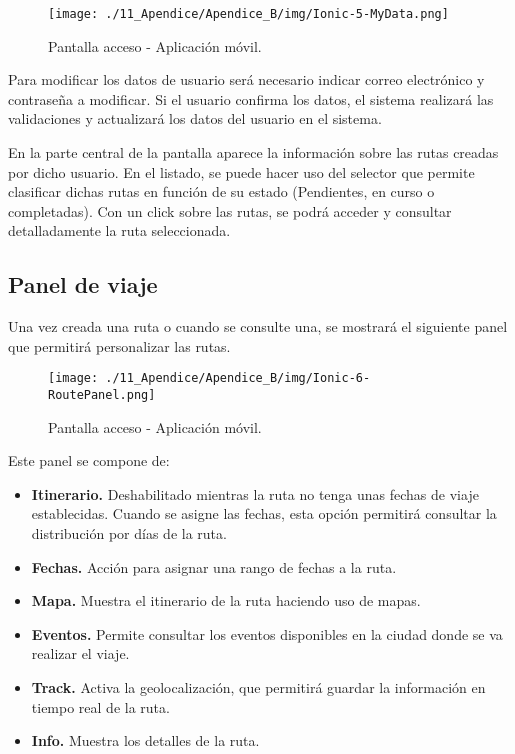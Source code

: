 \begin{figure}[H]
\centering
\texttt{[image: ./11\_Apendice/Apendice\_B/img/Ionic-5-MyData.png]}
\caption{Pantalla acceso - Aplicación móvil.}
\end{figure}


Para modificar los datos de usuario será necesario indicar correo electrónico y contraseña a modificar. Si el usuario confirma los datos, el sistema realizará las validaciones y actualizará los datos del usuario en el sistema.

En la parte central de la pantalla aparece la información sobre las rutas creadas por dicho usuario. En el listado, se puede hacer uso del selector que permite clasificar dichas rutas en función de su estado (Pendientes, en curso o completadas). Con un click sobre las rutas, se podrá acceder y consultar detalladamente la ruta seleccionada.


\newpage
\subsection*{Panel de viaje}
Una vez creada una ruta o cuando se consulte una, se mostrará el siguiente panel que permitirá personalizar las rutas.


\begin{figure}[H]
\centering
\texttt{[image: ./11\_Apendice/Apendice\_B/img/Ionic-6-RoutePanel.png]}
\caption{Pantalla acceso - Aplicación móvil.}
\end{figure}

Este panel se compone de:

\begin{itemize}
	\item \textbf{Itinerario. }Deshabilitado mientras la ruta no tenga unas fechas de viaje establecidas. Cuando se asigne las fechas, esta opción permitirá consultar la distribución por días de la ruta.
	
	\item \textbf{Fechas. }Acción para asignar una rango de fechas a la ruta.
	
	\item \textbf{Mapa. }Muestra el itinerario de la ruta haciendo uso de mapas.
	
	\item \textbf{Eventos. }Permite consultar los eventos disponibles en la ciudad donde se va realizar el viaje. 
	
	\item \textbf{Track. }Activa la geolocalización, que permitirá guardar la información en tiempo real de la ruta.
	
	\item \textbf{Info. }Muestra los detalles de la ruta.
\end{itemize}

